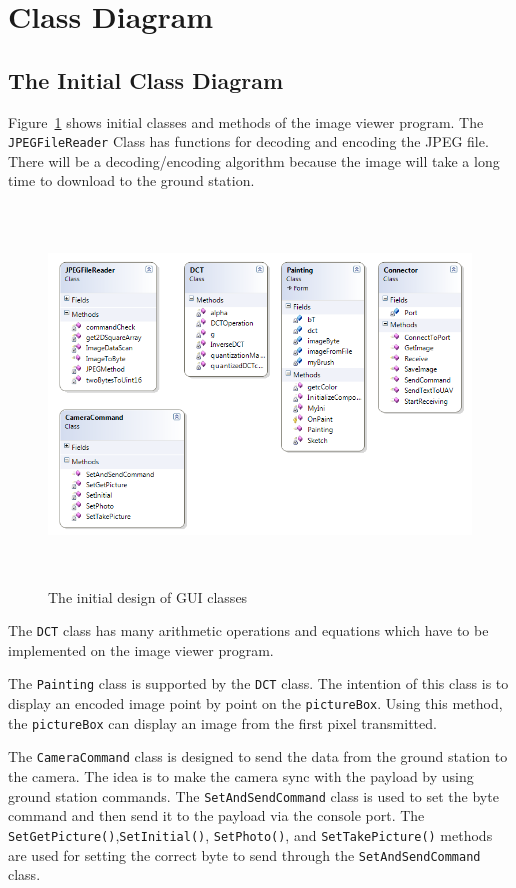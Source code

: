 \section{Class Diagram}
\subsection*{The Initial Class Diagram}
Figure~\ref{ini_Class} shows initial classes and methods of the image viewer program.
The \texttt{JPEGFileReader} Class has functions for decoding and encoding the JPEG file.
There will be a decoding/encoding algorithm because the image will take a long time to download to the ground station. 

\begin{center}
\begin{figure}[!hbtp]
\includegraphics[width=150mm,height=100mm]{figures/initialClassDiagram.png} 
\caption{The initial design of GUI classes\label{ini_Class}}
\end{figure}
\end{center}

The \texttt{DCT} class has many arithmetic operations and equations which have to be implemented on the image viewer program. 

The \texttt{Painting} class is supported by the \texttt{DCT} class. The intention of this class is to display an encoded image point by point on the \texttt{pictureBox}.
Using this method, the \texttt{pictureBox} can display an image from the first pixel transmitted.

The \texttt{CameraCommand} class is designed to send the data from the ground station to the camera. The idea is to make the camera sync with the payload by using ground station commands. The \texttt{SetAndSendCommand} class is used to set the byte command and then send it to the payload via the console port. The \texttt{SetGetPicture()},\texttt{SetInitial()}, \texttt{SetPhoto()}, and \texttt{SetTakePicture()} methods are used for setting the correct byte to send through the \texttt{SetAndSendCommand} class.

